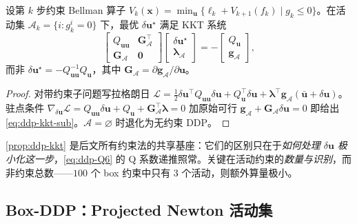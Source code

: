 \begin{proposition}
\label{prop:ddp-kkt}
设第 $k$ 步约束 Bellman 算子 $V_k(\mathbf{x})=\min_{\mathbf{u}}\{\ell_k+V_{k+1}(f_k)\mid g_k\le0\}$。在活动集 $\mathcal{A}_k=\{i:g_k^i=0\}$ 下，最优 $\delta\mathbf{u}^\star$ 满足 KKT 系统
\begin{equation}
  \begin{bmatrix}Q_{\mathbf{uu}}&\mathbf{G}_{\mathcal{A}}^\top\\\mathbf{G}_{\mathcal{A}}&\mathbf{0}\end{bmatrix}
  \begin{bmatrix}\delta\mathbf{u}^\star\\\boldsymbol{\lambda}_{\mathcal{A}}\end{bmatrix}
  =-\begin{bmatrix}Q_{\mathbf{u}}\\\mathbf{g}_{\mathcal{A}}\end{bmatrix},
  \label{eq:ddp-kkt-sub}
\end{equation}
而非 $\delta\mathbf{u}^\star=-Q_{\mathbf{uu}}^{-1}Q_{\mathbf{u}}$，其中 $\mathbf{G}_{\mathcal{A}}=\partial\mathbf{g}_{\mathcal{A}}/\partial\mathbf{u}$。
\end{proposition}
\begin{proof}
对带约束子问题写拉格朗日 $\mathcal{L}=\tfrac12\delta\mathbf{u}^\top Q_{\mathbf{uu}}\delta\mathbf{u}+Q_{\mathbf{u}}^\top\delta\mathbf{u}+\boldsymbol{\lambda}^\top\mathbf{g}_{\mathcal{A}}(\bar{\mathbf{u}}+\delta\mathbf{u})$。驻点条件 $\nabla_{\delta\mathbf{u}}\mathcal{L}=Q_{\mathbf{uu}}\delta\mathbf{u}+Q_{\mathbf{u}}+\mathbf{G}_{\mathcal{A}}^\top\boldsymbol{\lambda}=0$ 加原始可行 $\mathbf{g}_{\mathcal{A}}+\mathbf{G}_{\mathcal{A}}\delta\mathbf{u}=0$ 即给出 \cref{eq:ddp-kkt-sub}。$\mathcal{A}=\varnothing$ 时退化为无约束 DDP。
\end{proof}

\cref{prop:ddp-kkt} 是后文所有约束法的共享基座：它们的区别只在于\emph{如何处理 $\delta\mathbf{u}$ 极小化这一步}，\cref{eq:ddp-Q6} 的 Q 系数递推照常。关键在活动约束的\emph{数量与识别}，而非约束总数——$100$ 个 box 约束中只有 $3$ 个活动，则额外算量极小。

\subsection{Box-DDP：Projected Newton 活动集}
\label{sec:ddp-box}


